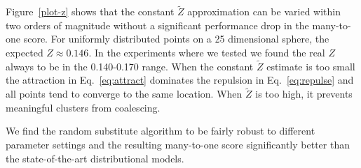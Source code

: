 Figure~\ref{plot-z} shows that the constant $\tilde{Z}$ approximation
can be varied within two orders of magnitude without a significant
performance drop in the many-to-one score.  For uniformly distributed
points on a 25 dimensional sphere, the expected $Z\approx 0.146$.  In
the experiments where we tested we found the real $Z$ always to be in
the 0.140-0.170 range.  When the constant $\tilde{Z}$ estimate is too
small the attraction in Eq.~\ref{eq:attract} dominates the repulsion
in Eq.~\ref{eq:repulse} and all points tend to converge to the same
location.  When $\tilde{Z}$ is too high, it prevents meaningful
clusters from coalescing.

We find the random substitute algorithm to be fairly robust to
different parameter settings and the resulting many-to-one score
significantly better than the state-of-the-art distributional models.





